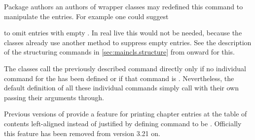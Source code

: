 Package authors an authors of wrapper classes may redefined this command to
manipulate the entries. For example one could suggest
\begin{lstcode}
  \renewcommand{\addtocentrydefault}[3]{%
    \ifstr{#3}{}{%
      \ifstr{#2}{}{%
        \addcontentsline{toc}{#1}{#3}%
      }{%
        \addcontentsline{toc}{#1}{\protect\numberline{#2}#3}%
      }%
    }%
  }%
\end{lstcode}
to omit entries with empty . In real live this would not be
needed, because the \KOMAScript{} classes already use another method to
suppress empty entries. See the description of the structuring commands in
\autoref{sec:maincls.structure} from 
onward for this.%
%
\EndIndexGroup


\begin{Declaration}
\end{Declaration}%
The \KOMAScript{} classes call the previously described
command
%
 directly only if no
individual command for the  has been defined or if that command
is . Nevertheless, the
default definition of all these individual commands simply call
 with their own 
passing their arguments through.%
%
\EndIndexGroup


\begin{Declaration}
\end{Declaration}
Previous versions of
\KOMAScript{} provide a feature for printing chapter entries at the table of
contents left-aligned instead of justified by defining command
 to be . Officially this feature
has been removed from \KOMAScript{} version 3.21 on.

